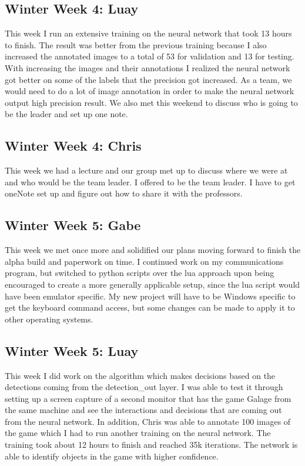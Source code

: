 \documentclass[onecolumn, draftclsnofoot,10pt, compsoc]{IEEEtran}
\begin{document}
\subsection{Winter Week 4: Luay}
This week I run an extensive training on the neural network that took 13 hours to finish. The result was better from the previous training because I also increased the annotated images to a total of 53 for validation and 13 for testing. With increasing the images and their annotations I realized the neural network got better on some of the labels that the precision got increased. As a team, we would need to do a lot of image annotation in order to make the neural network output high precision result. We also met this weekend to discuss who is going to be the leader and set up one note.
\subsection{Winter Week 4: Chris}
This week we had a lecture and our group met up to discuss where we were at and who would be the team leader. I offered to be the team leader. I have to get oneNote set up and figure out how to share it with the professors.
\subsection{Winter Week 5: Gabe}
This week we met once more and solidified our plans moving forward to finish the alpha build and paperwork on time. I continued work on my communications program, but switched to python scripts over the lua approach upon being encouraged to create a more generally applicable setup, since the lua script would have been emulator specific. My new project will have to be Windows specific to get the keyboard command access, but some changes can be made to apply it to other operating systems.
\subsection{Winter Week 5: Luay}
This week I did work on the algorithm which makes decisions based on the detections coming from the detection\_out layer. I was able to test it through setting up a screen capture of a second monitor that has the game Galage from the same machine and see the interactions and decisions that are coming out from the neural network. In addition, Chris was able to annotate 100 images of the game which I had to run another training on the neural network. The training took about 12 hours to finish and reached 35k iterations. The network is able to identify objects in the game with higher confidence.
\end{document}
